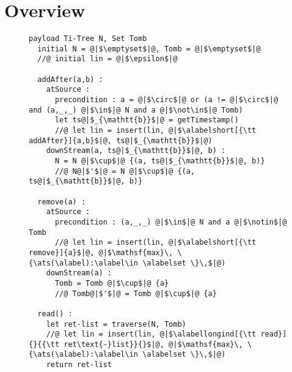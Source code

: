 \section{Overview}
\label{sec:overview}

\begin{figure}[t]
\begin{lstlisting}[caption={Pseudo-code of the Replicated Growable
Array (RGA) CRDT (adapted from~\cite{ShapiroPBZ11})},
captionpos=b,label={lst:rga}]
  payload Ti-Tree N, Set Tomb
  initial N = @|$\emptyset$|@, Tomb = @|$\emptyset$|@
  //@ initial lin = @|$\epsilon$|@

  addAfter(a,b) :
    atSource :
      precondition : a = @|$\circ$|@ or (a != @|$\circ$|@ and (a,_,_) @|$\in$|@ N and a @|$\not\in$|@ Tomb)
      let ts@|$_{\mathtt{b}}$|@ = getTimestamp()
      //@ let lin = insert(lin, @|$\alabelshort[{\tt addAfter}]{a,b}$|@, ts@|$_{\mathtt{b}}$|@)
    downStream(a, ts@|$_{\mathtt{b}}$|@, b) :
      N = N @|$\cup$|@ {(a, ts@|$_{\mathtt{b}}$|@, b)}
      //@ N@|$'$|@ = N @|$\cup$|@ {(a, ts@|$_{\mathtt{b}}$|@, b)}

  remove(a) :
    atSource :
      precondition : (a,_,_) @|$\in$|@ N and a @|$\notin$|@ Tomb
      //@ let lin = insert(lin, @|$\alabelshort[{\tt remove}]{a}$|@, @|$\mathsf{max}\, \{\ats(\alabel):\alabel\in \alabelset \}\,$|@)
    downStream(a) :
      Tomb = Tomb @|$\cup$|@ {a}
      //@ Tomb@|$'$|@ = Tomb @|$\cup$|@ {a}

  read() :
    let ret-list = traverse(N, Tomb)
    //@ let lin = insert(lin, @|$\alabellongind[{\tt read}]{}{{\tt ret\text{-}list}}{}$|@, @|$\mathsf{max}\, \{\ats(\alabel):\alabel\in \alabelset \}\,$|@)
    return ret-list
\end{lstlisting}
\end{figure}

